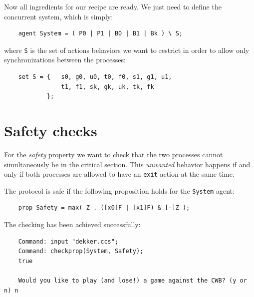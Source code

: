 \documentclass[10pt,a4paper]{article}
\newcommand{\CCSCode}[1]{{\tt #1}}
\begin{document}
        Now all ingredients for our recipe are ready. We just need to
        define the concurrent system, which is simply:
        \begin{verbatim}
    agent System = ( P0 | P1 | B0 | B1 | Bk ) \ S;
        \end{verbatim}
        where \CCSCode{S} is the set of actions behaviors we want to
        restrict in order to allow only synchronizations between the
        processes:
        \begin{verbatim}
    set S = {   s0, g0, u0, t0, f0, s1, g1, u1,
                t1, f1, sk, gk, uk, tk, fk
            };
        \end{verbatim}

\section{Safety checks}

    For the \emph{safety} property we want to check that the two
    processes cannot simultaneously be in the critical section.
    This \emph{unwanted} behavior happens if and only if both
    processes are allowed to have an \CCSCode{exit} action at the same
    time.

    The protocol is safe if the following proposition holds for the
    \CCSCode{System} agent:
    \begin{verbatim}
    prop Safety = max( Z . ([x0]F | [x1]F) & [-]Z );
    \end{verbatim}

    The checking has been achieved successfully:
    \begin{verbatim}
    Command: input "dekker.ccs";
    Command: checkprop(System, Safety);
    true

    Would you like to play (and lose!) a game against the CWB? (y or n) n
    \end{verbatim}
\end{document}
